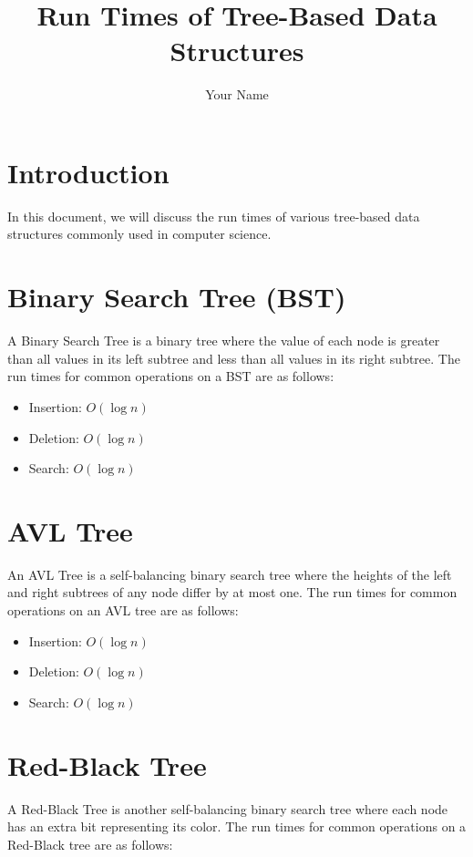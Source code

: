 \documentclass{article}
\title{Run Times of Tree-Based Data Structures}
\author{Your Name}
\begin{document}
\maketitle

\section{Introduction}

In this document, we will discuss the run times of various tree-based data structures commonly used in computer science.

\section{Binary Search Tree (BST)}

A Binary Search Tree is a binary tree where the value of each node is greater than all values in its left subtree and less than all values in its right subtree. The run times for common operations on a BST are as follows:

\begin{itemize}
    \item Insertion: $O(\log n)$
    \item Deletion: $O(\log n)$
    \item Search: $O(\log n)$
\end{itemize}

\section{AVL Tree}

An AVL Tree is a self-balancing binary search tree where the heights of the left and right subtrees of any node differ by at most one. The run times for common operations on an AVL tree are as follows:

\begin{itemize}
    \item Insertion: $O(\log n)$
    \item Deletion: $O(\log n)$
    \item Search: $O(\log n)$
\end{itemize}

\section{Red-Black Tree}

A Red-Black Tree is another self-balancing binary search tree where each node has an extra bit representing its color. The run times for common operations on a Red-Black tree are as follows:
\end{document}
